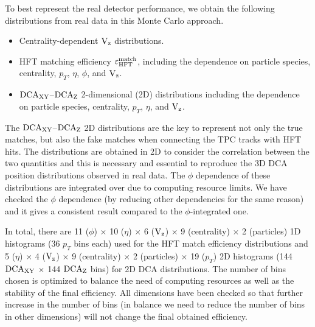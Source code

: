 \documentclass[%
 reprint,	
 amsmath,amssymb,
 aps,
 prc,
]{revtex4-1}
\begin{document}


To best represent the real detector performance, we obtain the following distributions from real data in this Monte Carlo approach.
\begin{itemize}
\item Centrality-dependent $\textup{V}_\textup{z}$ distributions.
\item HFT matching efficiency $\varepsilon_{\rm HFT}^{\rm match}$, including the dependence on particle species, centrality, $p_T$, $\eta$, $\phi$, and $\textup{V}_\textup{z}$.
\item $\textup{DCA}_{\textup{XY}}$--$\textup{DCA}_{\textup{Z}}$ 2-dimensional (2D) distributions including the dependence on particle species, centrality, $p_T$, $\eta$, and $\textup{V}_\textup{z}$.
\end{itemize}
The $\textup{DCA}_{\textup{XY}}$--$\textup{DCA}_{\textup{Z}}$ 2D distributions are the key to represent not only the true matches, but also the fake matches when connecting the TPC tracks with HFT hits. The distributions are obtained in 2D to consider the correlation between the two quantities and this is necessary and essential to reproduce the 3D DCA position distributions observed in real data. The $\phi$ dependence of these distributions are integrated over due to computing resource limits. We have checked the $\phi$ dependence (by reducing other dependencies for the same reason) and it gives a consistent result compared to the $\phi$-integrated one.

In total, there are 11 ($\phi$) $\times$ 10 ($\eta$) $\times$ 6 ($\textup{V}_\textup{z}$) $\times$ 9 (centrality) $\times$ 2 (particles) 1D histograms (36 $p_T$ bins each) used for the HFT match efficiency distributions and 5 ($\eta$) $\times$ 4 ($\textup{V}_\textup{z}$) $\times$ 9 (centrality) $\times$ 2 (particles) $\times$ 19 ($p_T$) 2D histograms (144 $\textup{DCA}_{\textup{XY}}$ $\times$ 144 $\textup{DCA}_{\textup{Z}}$ bins) for 2D DCA distributions. The number of bins chosen is optimized to balance the need of computing resources as well as the stability of the final efficiency. All dimensions have been checked so that further increase in the number of bins (in balance we need to reduce the number of bins in other dimensions)  will not change the final obtained efficiency.
\end{document}
